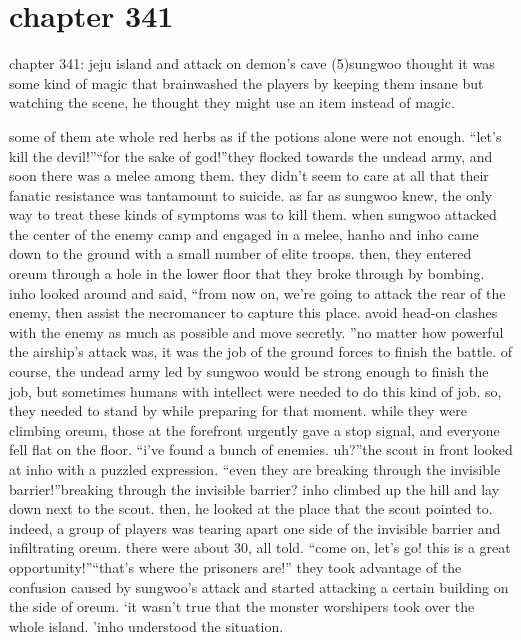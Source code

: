 \section{chapter 341}

chapter 341: jeju island and attack on demon’s cave (5)sungwoo thought it was some kind of magic that brainwashed the players by keeping them insane but watching the scene, he thought they might use an item instead of magic.





some of them ate whole red herbs as if the potions alone were not enough.
“let’s kill the devil!”“for the sake of god!”they flocked towards the undead army, and soon there was a melee among them.
they didn’t seem to care at all that their fanatic resistance was tantamount to suicide.
as far as sungwoo knew, the only way to treat these kinds of symptoms was to kill them.
when sungwoo attacked the center of the enemy camp and engaged in a melee, hanho and inho came down to the ground with a small number of elite troops.
 then, they entered oreum through a hole in the lower floor that they broke through by bombing.
inho looked around and said, “from now on, we’re going to attack the rear of the enemy, then assist the necromancer to capture this place.
 avoid head-on clashes with the enemy as much as possible and move secretly.
”no matter how powerful the airship’s attack was, it was the job of the ground forces to finish the battle.
 of course, the undead army led by sungwoo would be strong enough to finish the job, but sometimes humans with intellect were needed to do this kind of job.
 so, they needed to stand by while preparing for that moment.
while they were climbing oreum, those at the forefront urgently gave a stop signal, and everyone fell flat on the floor.
“i’ve found a bunch of enemies.
 uh?”the scout in front looked at inho with a puzzled expression.
“even they are breaking through the invisible barrier!”breaking through the invisible barrier? inho climbed up the hill and lay down next to the scout.
 then, he looked at the place that the scout pointed to.
indeed, a group of players was tearing apart one side of the invisible barrier and infiltrating oreum.
 there were about 30, all told.
“come on, let’s go! this is a great opportunity!”“that’s where the prisoners are!”
they took advantage of the confusion caused by sungwoo’s attack and started attacking a certain building on the side of oreum.
‘it wasn’t true that the monster worshipers took over the whole island.
’inho understood the situation.
